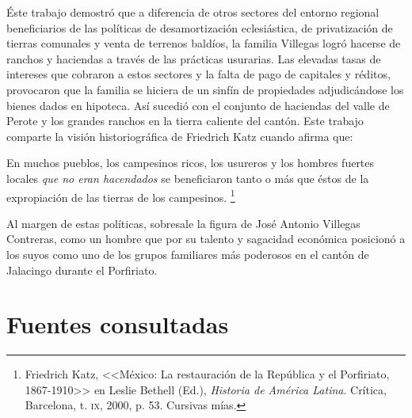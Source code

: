 \documentclass[14pt,twoside,final]{extbook} %
\let\oldfootnote\footnote
\renewcommand\footnote[1]{%
\oldfootnote{\hspace{1mm}#1}}
\begin{document}
Éste trabajo demostró que a diferencia de otros sectores del entorno regional beneficiarios de las políticas de desamortización eclesiástica, de privatización de tierras comunales y venta de terrenos baldíos, la familia Villegas logró hacerse de ranchos y haciendas a través de las prácticas usurarias. Las elevadas tasas de intereses que cobraron a estos sectores y la falta de pago de capitales y réditos, provocaron que la familia se hiciera de un sinfín de propiedades adjudicándose los bienes dados en hipoteca. Así sucedió con el conjunto de haciendas del valle de Perote y los grandes ranchos en la tierra caliente del cantón. Este trabajo comparte la visión historiográfica de Friedrich Katz cuando afirma que:
\begin{quoting}
En muchos pueblos, los campesinos ricos, los usureros y los hombres fuertes locales \emph{que no eran hacendados} se beneficiaron tanto o más que éstos de la expropiación de las tierras de los campesinos.\footnote{Friedrich Katz, <<México: La restauración de la República y el Porfiriato, 1867-1910>> en Leslie Bethell (Ed.), \emph{Historia de América Latina}. Crítica, Barcelona, t. \textsc{ix}, 2000, p. 53. Cursivas mías.}
\end{quoting}
Al margen de estas políticas, sobresale la figura de José Antonio Villegas Contreras, como un hombre que por su talento y sagacidad económica posicionó a los suyos como uno de los grupos familiares más poderosos en el cantón de Jalacingo durante el Porfiriato.
\newpage
\pagestyle{empty}
\null\vfill
\chapter*{Fuentes consultadas}\label{ch:fuentes-consultadas}
\thispagestyle{empty}
\pagestyle{fancy}
\fancyhf{} %
\fancyhead[RO,LE]{\thepage}
\renewcommand{\headrulewidth}{0pt}
\setcounter{page}{131}
\end{document}
